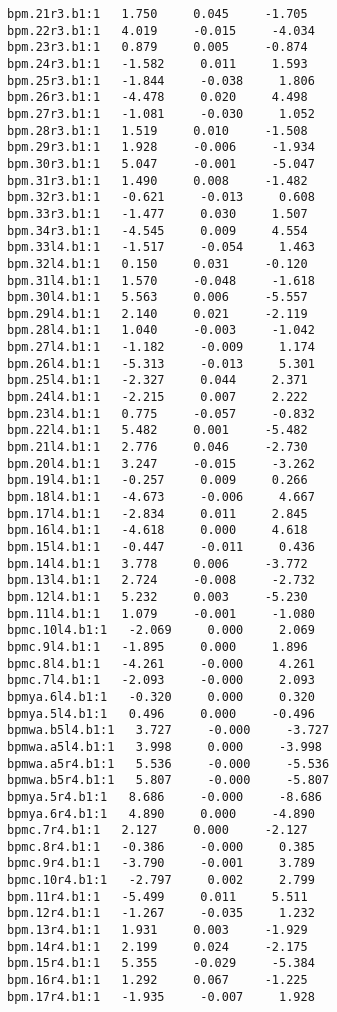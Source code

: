 \begin{verbatim}
bpm.21r3.b1:1   1.750     0.045     -1.705
bpm.22r3.b1:1   4.019     -0.015     -4.034
bpm.23r3.b1:1   0.879     0.005     -0.874
bpm.24r3.b1:1   -1.582     0.011     1.593
bpm.25r3.b1:1   -1.844     -0.038     1.806
bpm.26r3.b1:1   -4.478     0.020     4.498
bpm.27r3.b1:1   -1.081     -0.030     1.052
bpm.28r3.b1:1   1.519     0.010     -1.508
bpm.29r3.b1:1   1.928     -0.006     -1.934
bpm.30r3.b1:1   5.047     -0.001     -5.047
bpm.31r3.b1:1   1.490     0.008     -1.482
bpm.32r3.b1:1   -0.621     -0.013     0.608
bpm.33r3.b1:1   -1.477     0.030     1.507
bpm.34r3.b1:1   -4.545     0.009     4.554
bpm.33l4.b1:1   -1.517     -0.054     1.463
bpm.32l4.b1:1   0.150     0.031     -0.120
bpm.31l4.b1:1   1.570     -0.048     -1.618
bpm.30l4.b1:1   5.563     0.006     -5.557
bpm.29l4.b1:1   2.140     0.021     -2.119
bpm.28l4.b1:1   1.040     -0.003     -1.042
bpm.27l4.b1:1   -1.182     -0.009     1.174
bpm.26l4.b1:1   -5.313     -0.013     5.301
bpm.25l4.b1:1   -2.327     0.044     2.371
bpm.24l4.b1:1   -2.215     0.007     2.222
bpm.23l4.b1:1   0.775     -0.057     -0.832
bpm.22l4.b1:1   5.482     0.001     -5.482
bpm.21l4.b1:1   2.776     0.046     -2.730
bpm.20l4.b1:1   3.247     -0.015     -3.262
bpm.19l4.b1:1   -0.257     0.009     0.266
bpm.18l4.b1:1   -4.673     -0.006     4.667
bpm.17l4.b1:1   -2.834     0.011     2.845
bpm.16l4.b1:1   -4.618     0.000     4.618
bpm.15l4.b1:1   -0.447     -0.011     0.436
bpm.14l4.b1:1   3.778     0.006     -3.772
bpm.13l4.b1:1   2.724     -0.008     -2.732
bpm.12l4.b1:1   5.232     0.003     -5.230
bpm.11l4.b1:1   1.079     -0.001     -1.080
bpmc.10l4.b1:1   -2.069     0.000     2.069
bpmc.9l4.b1:1   -1.895     0.000     1.896
bpmc.8l4.b1:1   -4.261     -0.000     4.261
bpmc.7l4.b1:1   -2.093     -0.000     2.093
bpmya.6l4.b1:1   -0.320     0.000     0.320
bpmya.5l4.b1:1   0.496     0.000     -0.496
bpmwa.b5l4.b1:1   3.727     -0.000     -3.727
bpmwa.a5l4.b1:1   3.998     0.000     -3.998
bpmwa.a5r4.b1:1   5.536     -0.000     -5.536
bpmwa.b5r4.b1:1   5.807     -0.000     -5.807
bpmya.5r4.b1:1   8.686     -0.000     -8.686
bpmya.6r4.b1:1   4.890     0.000     -4.890
bpmc.7r4.b1:1   2.127     0.000     -2.127
bpmc.8r4.b1:1   -0.386     -0.000     0.385
bpmc.9r4.b1:1   -3.790     -0.001     3.789
bpmc.10r4.b1:1   -2.797     0.002     2.799
bpm.11r4.b1:1   -5.499     0.011     5.511
bpm.12r4.b1:1   -1.267     -0.035     1.232
bpm.13r4.b1:1   1.931     0.003     -1.929
bpm.14r4.b1:1   2.199     0.024     -2.175
bpm.15r4.b1:1   5.355     -0.029     -5.384
bpm.16r4.b1:1   1.292     0.067     -1.225
bpm.17r4.b1:1   -1.935     -0.007     1.928

\end{verbatim}
